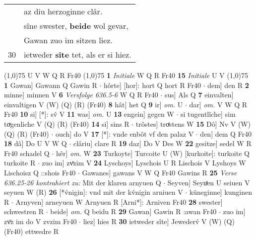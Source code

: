\documentclass[8pt,a4paper,notitlepage]{article}
\begin{document}
\begin{table}[ht]
\begin{minipage}[t]{0.5\linewidth}
\begin{tabular}{rl}
 & az diu herzoginne clâr.\\ 
 & sîne swester, \textbf{beide} wol gevar,\\ 
 & Gawan zuo im sitzen liez.\\ 
30 & ietweder \textbf{sîte} tet, als er si hiez.\\ 
\end{tabular}
\scriptsize
\line(1,0){75} \newline
U V W Q R Fr40 \newline
\line(1,0){75} \newline
\textbf{1} \textit{Initiale} W Q R Fr40  \textbf{15} \textit{Initiale} U V  \newline
\line(1,0){75} \newline
\textbf{1} Gawan] Gawann Q Gawin R  $\cdot$ hôrte] [hor]: hort Q hort R Fr40  $\cdot$ dem] den R \textbf{2} minne] minnen V \textbf{6} \textit{Versfolge 636.5-6} W Q R Fr40   $\cdot$ sus] Als Q \textbf{7} einvalten] einvaltigen V (W) (Q) (R) (Fr40) \textbf{8} hât] het Q \textbf{9} ir] \textit{om.} U  $\cdot$ dar] \textit{om.} V W Q R Fr40 \textbf{10} si] [*]: sv́ V \textbf{11} was] \textit{om.} U \textbf{13} engein] gegen W  $\cdot$ si tugentlîche] sim toͮgenliche V (Q) (R) (Fr40) \textbf{14} si] sins R  $\cdot$ trôstes] troͤstens W \textbf{15} Dô] Nv V (W) (Q) (R) (Fr40)  $\cdot$ ouch] do V \textbf{17} [*]: vnde enbôt vf den palaz V  $\cdot$ den] dem Q Fr40 \textbf{18} dâ] Do U V W Q  $\cdot$ clâriu] clare R \textbf{19} daz] Do V Des W \textbf{22} gesitze] sedel W R Fr40 schadel Q  $\cdot$ hêr] \textit{om.} W \textbf{23} Turkoyte] Turcoite U (W) [kurkoite]: turkoite  Q turkoite R  $\cdot$ zuo im] zvͦzim V \textbf{24} Lyschoys] Lyschois U R Lischois V Lyshoys W Lischoisz Q ::shois Fr40  $\cdot$ Gawanes] gawans V W Q Fr40 Gawins R \textbf{25} \textit{Verse 636.25-26 kontrahiert zu:} Mit der klaren arnyuen Q   $\cdot$ Seyven] Seyuͦen U seiuen V seyuen W (R) \textbf{26} [*v́nigin]: vnd mit der kv́nigin arniuen V  $\cdot$ küneginne] kunginen R  $\cdot$ Arnyven] arneyuen W Arnyuen R [Arni*]: Arniven Fr40 \textbf{28} swester] schwestren R  $\cdot$ beide] \textit{om.} Q beidu R \textbf{29} Gawan] Gawin R :awan Fr40  $\cdot$ zuo im] zvͦz im do V zvzim Fr40  $\cdot$ liez] hies R \textbf{30} ietweder sîte] Jewederv́ V (W) (Q) (Fr40) ettwedre R \newline
\end{minipage}
\end{table}
\end{document}

